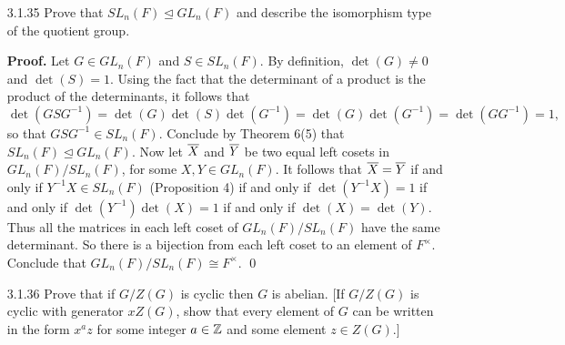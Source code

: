 \begin{enumerate}
      \begin{enumerate}
         \item We have $r\{r^k\}r^{-1} = \{r^k\} \subseteq \cyc{r^k}$ and
               $s\{r^k\}s^{-1} = \{r^{-k}\} \subseteq \cyc{r^k}$, so that
               $\cyc{r^k} \trianglelefteq D_{2n}$ by Exercise 29.
         \item By Proposition 2.5 (3) $|r^k| = n/k$; so $|\cyc{r^k}| = n/k$ by
               Proposition 2.2. So each coset of $D_{2n}/\cyc{r^k}$ has order
               $n/k$; that is, $|D_{2n}/\cyc{r^k}| = 2n/(n/k) = 2k$. We have 
               that $\m{r}^k = \m{s}^2 = \m{1}$ because
               $1 = s^2, r^k \in \cyc{r^k}$. Thus we have by Exercise 16 that
               $$D_{2n}/\cyc{r^k} = \{\m{r}, \m{s} : \m{r}^k = \m{s}^2 = \m{1},
                 \m{r}\cdot\m{s} = \m{s}\cdot\m{r}^{-1}\}.$$
               The above presentation for $D_{2n}/\cyc{r^k}$ shows that
               $\m{r}$, $\m{s} \in D_{2n}/\cyc{r^k}$ satisfy the same
               relations that $r, s \in D_{2k}$ satisfy, and since
               $|D_{2n}/\cyc{r^k}| = |D_{2k}| = 2k$, conclude that
               $D_{2n}/\cyc{r^k} \cong D_{2k}$.
      \end{enumerate} \qed
   \item[3.1.35]  Prove that $SL_n(F) \trianglelefteq GL_n(F)$ and describe the
                  isomorphism type of the quotient group.

      \textbf{Proof.} Let $G \in GL_n(F)$ and $S \in SL_n(F)$. By definition,
      $\det(G) \neq 0$ and $\det(S) = 1$. Using the fact that the determinant of
      a product is the product of the determinants, it follows that
      $$\det(GSG^{-1}) = \det(G)\det(S)\det(G^{-1}) = \det(G)\det(G^{-1}) =
        \det(GG^{-1}) = 1,$$
      so that $GSG^{-1} \in SL_n(F)$. Conclude by Theorem 6(5) that
      $SL_n(F) \trianglelefteq GL_n(F)$. Now let $\overline{X}$ and $\overline{Y}$ be two 
      equal left cosets in $GL_n(F)/SL_n(F)$, for some $X, Y \in GL_n(F)$. It 
      follows that $\overline{X} = \overline{Y}$ if and only if $Y^{-1}X \in SL_n(F)$ 
      (Proposition 4) if and only if $\det(Y^{-1}X) = 1$ if and only if
      $\det(Y^{-1})\det(X) = 1$ if and only if $\det(X) = \det(Y)$. Thus all the
      matrices in each left coset of $GL_n(F)/SL_n(F)$ have the same
      determinant. So there is a bijection from each left coset to an element of
      $F^\times$. Conclude that $GL_n(F)/SL_n(F) \cong F^\times$. \qed
   \item[3.1.36]  Prove that if $G/Z(G)$ is cyclic then $G$ is abelian. [If
                  $G/Z(G)$ is cyclic with generator $xZ(G)$, show that every
                  element of $G$ can be written in the form $x^az$ for some
                  integer $a \in \mathbb{Z}$ and some element $z \in Z(G)$.]


\end{enumerate}
